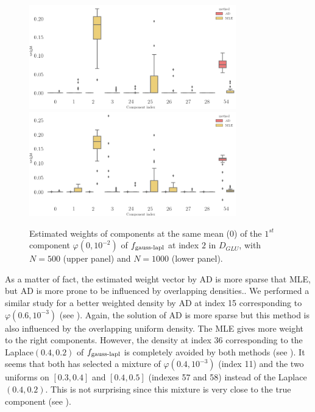 \begin{figure}
\center
    \includegraphics[width=0.8\textwidth]{./TeX_files/weight_f_gauss_laplace_around2_comp_N_500.png}
    \includegraphics[width=0.8\textwidth]{./TeX_files/weight_f_gauss_laplace_around2_comp_N_1000.png}
    \caption{Estimated weights of components at the same mean ($0$) of the $1^{st}$ component $\varphi(0, 10^{-2})$ of $f_{\textnormal{gauss-lapl}}$ at index $2$ in $D_{GLU}$, with $N=500$ (upper panel) and $N=1000$
    (lower panel).}
    \label{fig:weights_gauss_laplace_around2_indexes}
\end{figure}
As a matter of fact, the estimated weight vector by AD is more sparse that MLE, but AD is more prone to be influenced by overlapping densities.. We performed a similar study for a better weighted density by AD at index 15 corresponding to $\varphi(0.6, 10^{-3})$ (see ). Again, the solution of AD is more sparse but this method is also influenced by the overlapping uniform density. The MLE gives more weight to the right components. However, the density at index 36 corresponding to the Laplace$(0.4, 0.2)$ of $f_{\textnormal{gauss-lapl}}$ is completely avoided by both methods (see ). It seems that both has selected a mixture of $\varphi(0.4, 10^{-3})$ (index 11) and the two uniforms on $[0.3, 0.4]$ and $[0.4, 0.5]$ (indexes 57 and 58) instead of the Laplace$(0.4, 0.2)$. This is not surprising since this mixture is very close to the true component (see ).
